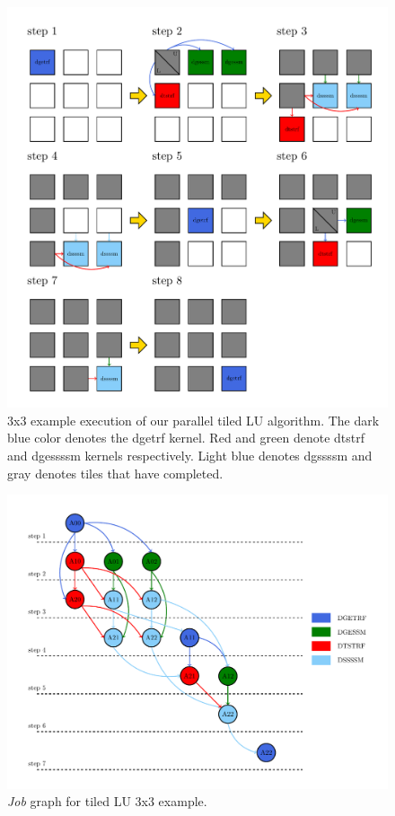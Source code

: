 \begin{figure}[!ht]
\center
\includegraphics[width=0.8\columnwidth]{figures/3x3example}
\caption{	3x3 example execution of our parallel tiled LU algorithm.  The dark blue color
					denotes the dgetrf kernel.  Red and green denote dtstrf and dgessssm kernels respectively.
					Light blue denotes dgssssm and gray denotes tiles that have completed.}
\label{fig:3x3lu_example}
\end{figure}

\begin{figure}[!ht]
\center
\includegraphics[width=0.8\columnwidth]{figures/lu_task_graph_3x3}
\caption{\emph{Job} graph for tiled LU 3x3 example.}
\label{fig:lu_task_graph_3x3}
\end{figure}

